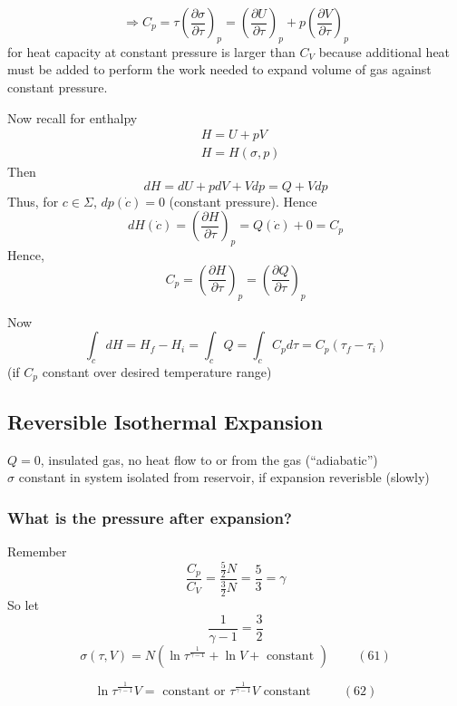\[
\Longrightarrow C_p = \tau \left( \frac{ \partial \sigma }{ \partial \tau} \right)_p = \left( \frac{ \partial U}{ \partial \tau} \right)_p + p \left( \frac{ \partial V}{ \partial \tau} \right)_p
\]
for heat capacity at constant pressure is larger than $C_V$ because additional heat must be added to perform the work needed to expand volume of gas against constant pressure.  

Now recall for enthalpy 
\[
\begin{aligned}
  & H = U+ pV \\ 
  & H = H(\sigma, p)
\end{aligned}
\]
Then
\[
dH = dU+ pdV + Vdp = Q + Vdp 
\]
Thus, for $c\in \Sigma$, $dp(\dot{c})=0$ (constant pressure).  Hence
\[
dH(\dot{c}) = \left( \frac{ \partial H}{ \partial \tau} \right)_p = Q(\dot{c})  +  0 = C_p
\]
Hence, 
\[
C_p = \left( \frac{ \partial H}{ \partial \tau } \right)_p = \left( \frac{ \partial Q}{ \partial \tau} \right)_p
\]

Now
\[
\int_c dH = H_f - H_i = \int_c Q = \int_c C_p d\tau = C_p(\tau_f - \tau_i)
\]
(if $C_p$ constant over desired temperature range)



\subsection*{Reversible Isothermal Expansion}

$Q=0$, insulated gas, no heat flow to or from the gas (``adiabatic'') \\
$\sigma$ constant in system isolated from reservoir, if expansion reverisble (slowly)

\subsubsection*{What is the pressure after expansion?}

Remember 
\[
\frac{C_p}{C_V} = \frac{ \frac{5}{2} N }{ \frac{3}{2} N } = \frac{5}{3} = \gamma 
\]
So let 
\[
\frac{1}{\gamma- 1} = \frac{3}{2}
\]
\begin{equation}
  \sigma(\tau,V) = N ( \ln{ \tau^{\frac{1}{ \gamma - 1 } } + \ln{V} + \text{ constant } } ) \quad \quad \, (61)
\end{equation}

\begin{equation}
  \ln{ \tau^{\frac{1}{ \gamma -1 } }V} = \text{ constant or } \tau^{ \frac{1}{\gamma-1}}V \text{ constant } \quad \quad \, (62)
\end{equation}

